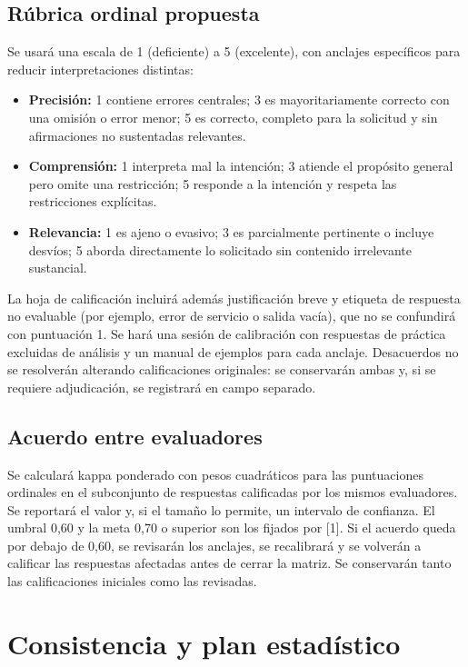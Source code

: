 \documentclass[conference]{IEEEtran}
\begin{document}
\subsection{Rúbrica ordinal propuesta}
Se usará una escala de 1 (deficiente) a 5 (excelente), con anclajes específicos para reducir interpretaciones distintas:
\begin{itemize}[leftmargin=*]
\item \textbf{Precisión:} 1 contiene errores centrales; 3 es mayoritariamente correcto con una omisión o error menor; 5 es correcto, completo para la solicitud y sin afirmaciones no sustentadas relevantes.
\item \textbf{Comprensión:} 1 interpreta mal la intención; 3 atiende el propósito general pero omite una restricción; 5 responde a la intención y respeta las restricciones explícitas.
\item \textbf{Relevancia:} 1 es ajeno o evasivo; 3 es parcialmente pertinente o incluye desvíos; 5 aborda directamente lo solicitado sin contenido irrelevante sustancial.
\end{itemize}
La hoja de calificación incluirá además justificación breve y etiqueta de respuesta no evaluable (por ejemplo, error de servicio o salida vacía), que no se confundirá con puntuación 1. Se hará una sesión de calibración con respuestas de práctica excluidas de análisis y un manual de ejemplos para cada anclaje. Desacuerdos no se resolverán alterando calificaciones originales: se conservarán ambas y, si se requiere adjudicación, se registrará en campo separado.

\subsection{Acuerdo entre evaluadores}
Se calculará kappa ponderado con pesos cuadráticos para las puntuaciones ordinales en el subconjunto de respuestas calificadas por los mismos evaluadores. Se reportará el valor y, si el tamaño lo permite, un intervalo de confianza. El umbral 0,60 y la meta 0,70 o superior son los fijados por [1]. Si el acuerdo queda por debajo de 0,60, se revisarán los anclajes, se recalibrará y se volverán a calificar las respuestas afectadas antes de cerrar la matriz. Se conservarán tanto las calificaciones iniciales como las revisadas.

\section{Consistencia y plan estadístico}
\end{document}

